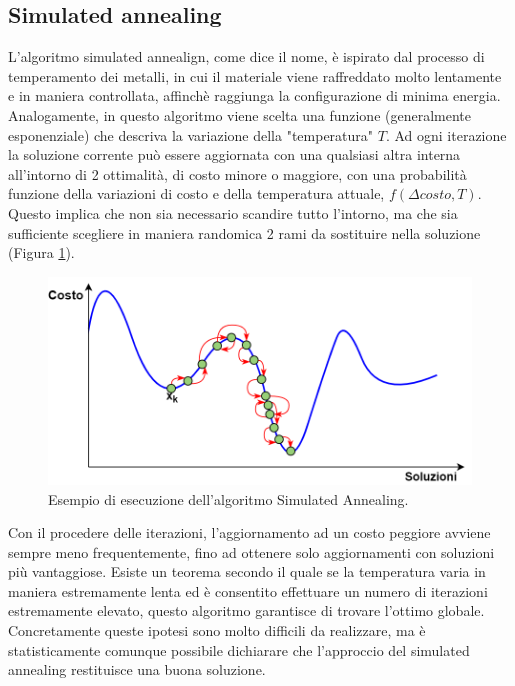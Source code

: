 \subsection{Simulated annealing}
L'algoritmo simulated annealign, come dice il nome, è ispirato dal processo di temperamento dei metalli, in cui il materiale viene raffreddato molto lentamente e in maniera controllata, affinchè raggiunga la configurazione di minima energia. Analogamente, in questo algoritmo viene scelta una funzione (generalmente esponenziale) che descriva la variazione della "temperatura" $T$. Ad ogni iterazione la soluzione corrente può essere aggiornata con una qualsiasi altra interna all'intorno di 2 ottimalità, di costo minore o maggiore, con una probabilità funzione della variazioni di costo e della temperatura attuale, $f(\Delta costo, T)$. Questo implica che non sia necessario scandire tutto l'intorno, ma che sia sufficiente scegliere in maniera randomica 2 rami da sostituire nella soluzione (Figura \ref{simulated_annealing}).
 \begin{figure}[H]
\begin{center} 
  \includegraphics[scale=0.43]{Images/simulated_anneling}
  \caption{\footnotesize{Esempio di esecuzione dell'algoritmo Simulated Annealing.}}
  \label{simulated_annealing}
\end{center}
\end{figure}
 Con il procedere delle iterazioni, l'aggiornamento ad un costo peggiore avviene sempre meno frequentemente, fino ad ottenere solo aggiornamenti con soluzioni più vantaggiose. Esiste un teorema secondo il quale se la temperatura varia in maniera estremamente lenta ed è consentito effettuare un numero di iterazioni estremamente elevato, questo algoritmo garantisce di trovare l'ottimo globale. Concretamente queste ipotesi sono molto difficili da realizzare, ma è statisticamente comunque possibile dichiarare che l'approccio del simulated annealing restituisce una buona soluzione.
